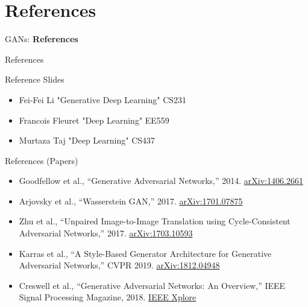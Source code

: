 \section{References}
\begin{frame}{}
    \LARGE GANs: \textbf{References}
\end{frame}

\begin{frame}{References}

Reference Slides
\begin{itemize}
    \item Fei-Fei Li "Generative Deep Learning" CS231
    \item Francois Fleuret "Deep Learning" EE559
    \item Murtaza Taj "Deep Learning" CS437
\end{itemize}
    
\end{frame}

\begin{frame}{References (Papers)}

\begin{itemize}
    \item Goodfellow et al., ``Generative Adversarial Networks,'' 2014. \href{https://arxiv.org/abs/1406.2661}{arXiv:1406.2661}
    \item Arjovsky et al., ``Wasserstein GAN,'' 2017. \href{https://arxiv.org/abs/1701.07875}{arXiv:1701.07875}
    \item Zhu et al., ``Unpaired Image-to-Image Translation using Cycle-Consistent Adversarial Networks,'' 2017. \href{https://arxiv.org/abs/1703.10593}{arXiv:1703.10593}
    \item Karras et al., ``A Style-Based Generator Architecture for Generative Adversarial Networks,'' CVPR 2019. \href{https://arxiv.org/abs/1812.04948}{arXiv:1812.04948}
    \item Creswell et al., ``Generative Adversarial Networks: An Overview,'' IEEE Signal Processing Magazine, 2018. \href{https://ieeexplore.ieee.org/document/8280743}{IEEE Xplore}
\end{itemize}

\end{frame}
